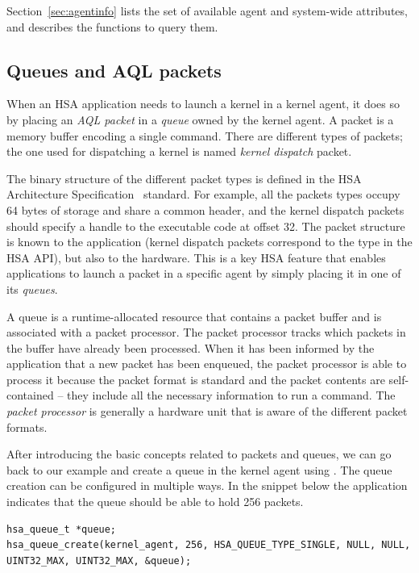 \documentclass[oneside]{book}
\begin{document}

Section~\ref{sec:agentinfo} lists the set of available agent and
system-wide attributes, and describes the functions to query them.

\subsection{Queues and AQL packets}
When an HSA application needs to launch a kernel in a kernel agent, it does so
by placing an \textit{AQL packet} in a \textit{queue} owned by the kernel
agent. A packet is a memory buffer encoding a single command. There are
different types of packets; the one used for dispatching a kernel is named
\emph{kernel dispatch} packet.

The binary structure of the different packet types is defined in the HSA
Architecture Specification~\cite{sar} standard. For example, all the packets
types occupy 64 bytes of storage and share a common header, and the kernel
dispatch packets should specify a handle to the executable code at offset
32. The packet structure is known to the application (kernel dispatch packets
correspond to the  type in the HSA API),
but also to the hardware. This is a key HSA feature that enables applications to
launch a packet in a specific agent by simply placing it in one of its
\textit{queues}.

A queue is a runtime-allocated resource that contains a packet buffer and is
associated with a packet processor. The packet processor tracks which packets in
the buffer have already been processed. When it has been informed by the
application that a new packet has been enqueued, the packet processor is able to
process it because the packet format is standard and the packet contents are
self-contained -- they include all the necessary information to run a
command. The \textit{packet processor} is generally a hardware unit that is
aware of the different packet formats.

After introducing the basic concepts related to packets and queues, we can go
back to our example and create a queue in the kernel agent using
. The queue creation can be configured in multiple
ways. In the snippet below the application indicates that the queue should
be able to hold 256 packets.
\begin{lstlisting}
hsa_queue_t *queue;
hsa_queue_create(kernel_agent, 256, HSA_QUEUE_TYPE_SINGLE, NULL, NULL, UINT32_MAX, UINT32_MAX, &queue);
\end{lstlisting}
\end{document}
